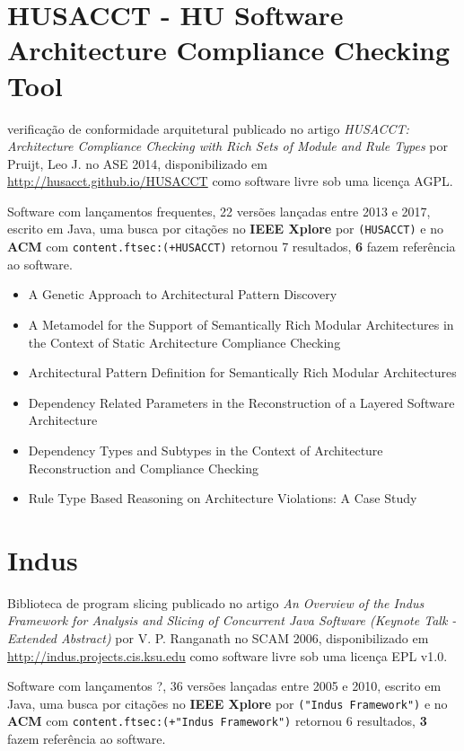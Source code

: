 \section{HUSACCT - HU Software Architecture Compliance Checking Tool}

verificação de conformidade arquitetural
publicado no artigo {\it HUSACCT: Architecture Compliance Checking with Rich Sets of Module and Rule Types}
por Pruijt, Leo J.
no ASE 2014,
disponibilizado em \url{http://husacct.github.io/HUSACCT}
como software livre
sob uma licença AGPL.

Software com lançamentos frequentes,
22 versões lançadas
entre 2013 e 2017,
escrito em Java,
uma busca por citações no {\bf IEEE Xplore} por
\texttt{(HUSACCT)}
e no {\bf ACM} com
\texttt{content.ftsec:(+HUSACCT)}
retornou
7 resultados,
{\bf 6} fazem referência ao software.

\begin{itemize}
\item A Genetic Approach to Architectural Pattern Discovery
\item A Metamodel for the Support of Semantically Rich Modular Architectures in the Context of Static Architecture Compliance Checking
\item Architectural Pattern Definition for Semantically Rich Modular Architectures
\item Dependency Related Parameters in the Reconstruction of a Layered Software Architecture
\item Dependency Types and Subtypes in the Context of Architecture Reconstruction and Compliance Checking
\item Rule Type Based Reasoning on Architecture Violations: A Case Study
\end{itemize}

\section{Indus}

Biblioteca de program slicing
publicado no artigo {\it An Overview of the Indus Framework for Analysis and Slicing of Concurrent Java Software (Keynote Talk - Extended Abstract)}
por V. P. Ranganath
no SCAM 2006,
disponibilizado em \url{http://indus.projects.cis.ksu.edu}
como software livre
sob uma licença EPL v1.0.

Software com lançamentos ?,
36 versões lançadas
entre 2005 e 2010,
escrito em Java,
uma busca por citações no {\bf IEEE Xplore} por
\texttt{("Indus Framework")}
e no {\bf ACM} com
\texttt{content.ftsec:(+"Indus Framework")}
retornou
6 resultados,
{\bf 3} fazem referência ao software.

